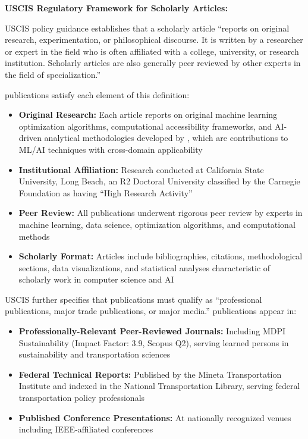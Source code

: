 \textbf{USCIS Regulatory Framework for Scholarly Articles:}

USCIS policy guidance establishes that a scholarly article ``reports on original research, experimentation, or philosophical discourse. It is written by a researcher or expert in the field who is often affiliated with a college, university, or research institution. Scholarly articles are also generally peer reviewed by other experts in the field of specialization.''

\drs publications satisfy each element of this definition:

\begin{itemize}
    \item \textbf{Original Research:} Each article reports on original machine learning optimization algorithms, computational accessibility frameworks, and AI-driven analytical methodologies developed by \dr, which are contributions to ML/AI techniques with cross-domain applicability
    \item \textbf{Institutional Affiliation:} Research conducted at California State University, Long Beach, an R2 Doctoral University classified by the Carnegie Foundation as having ``High Research Activity''
    \item \textbf{Peer Review:} All publications underwent rigorous peer review by experts in machine learning, data science, optimization algorithms, and computational methods
    \item \textbf{Scholarly Format:} Articles include bibliographies, citations, methodological sections, data visualizations, and statistical analyses characteristic of scholarly work in computer science and AI
\end{itemize}

USCIS further specifies that publications must qualify as ``professional publications, major trade publications, or major media.'' \drs publications appear in:

\begin{itemize}
    \item \textbf{Professionally-Relevant Peer-Reviewed Journals:} Including MDPI Sustainability (Impact Factor: 3.9, Scopus Q2), serving learned persons in sustainability and transportation sciences
    \item \textbf{Federal Technical Reports:} Published by the Mineta Transportation Institute and indexed in the National Transportation Library, serving federal transportation policy professionals
    \item \textbf{Published Conference Presentations:} At nationally recognized venues including IEEE-affiliated conferences
\end{itemize}

